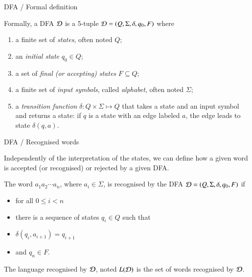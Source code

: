 \documentclass[compress,dvips,xcolor={dvipsnames},t]{beamer}
\begin{document}
%
\begin{frame}{DFA / Formal definition}

Formally, a DFA \({\cal D}\) is a 5-tuple \({\cal D} = (Q, \Sigma,
\delta, q_0, F)\) where
\begin{enumerate}

  \item a finite set of \emph{states}, often noted \(Q\);

  \item an \emph{initial state} \(q_0 \in Q\);

  \item a set of \emph{final (\emph{or} accepting)
  states} \(F \subseteq Q\);

  \item a finite set of \emph{input symbols}, called \emph{alphabet},
    often noted \(\Sigma\);

  \item a \emph{transition function} \(\delta: Q \times \Sigma \mapsto
    Q\) that takes
  a state and an input symbol and returns a state: if \(q\) is a state
  with an edge labeled \(a\), the edge leads to state \(\delta(q,
  a)\).

\end{enumerate}

\end{frame}

%
\begin{frame}{DFA / Recognised words}

Independently of the interpretation of the states, we can define how a
given word is accepted (or recognised) or rejected by a given DFA.

\bigskip

The word \(a_1 a_2 \cdots a_n\), where \(a_i \in \Sigma\), is
recognised by the DFA \({\cal D} = (Q, \Sigma, \delta, q_0, F)\) if
\begin{itemize}

  \item for all \(0 \leqslant i < n\)

  \item there is a sequence of states \(q_i \in Q\) such that

  \item \(\delta (q_i, a_{i+1}) = q_{i+1}\)

  \item and \(q_n \in F\).

\end{itemize}
The language recognised by \(\cal D\), noted \(L({\cal D})\) is the
set of words recognised by \(\cal D\).

\end{frame}
\end{document}
